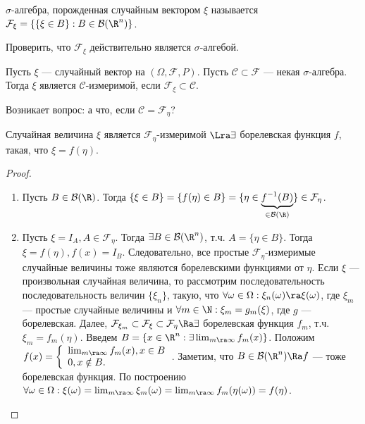 \begin{definition}
    \(\sigma\)-алгебра, порожденная случайным вектором \(\xi\) называется \(\mathcal{F}_\xi = \{\{\xi \in B\}: B \in \mathcal{B}(\R^n)\}\).
\end{definition}

\begin{exercise}
    Проверить, что \(\mathcal{F}_\xi\) действительно является \(\sigma\)-алгебой.
\end{exercise}

\begin{definition}
    Пусть \(\xi\) --- случайный вектор на \((\Omega, \mathcal{F}, P)\). Пусть \(\mathcal{C} \subset \mathcal{F}\) --- некая \(\sigma\)-алгебра. Тогда \(\xi\) является \(\mathcal{C}\)-измеримой, если \(\mathcal{F}_\xi \subset \mathcal{C}\).
\end{definition}

Возникает вопрос: а что, если \(\mathcal{C} = \mathcal{F}_\eta\)?
\begin{lemma}
    Случайная величина \(\xi\) является \(\mathcal{F}_\eta\)-измеримой \(\Lra \exists\) борелевская функция \(f\), такая, что \(\xi = f(\eta)\).
\end{lemma}
\begin{proof}\indent
    \begin{enumerate}
        \item [\(\La\)] Пусть \(B \in \mathcal{B}(\R)\). Тогда \(\{\xi \in B\} = \{f(\eta) \in B\} = \{\eta \in \underbrace{f^{-1}(B)}_{\in \mathcal{B}(\R)}\} \in \mathcal{F}_\eta\).
        \item [\(\Ra\)] Пусть \(\xi = I_A, A \in \mathcal{F}_\eta\). Тогда \(\exists B \in \mathcal{B}(\R^n)\), т.ч. \(A = \{\eta \in B\}\). Тогда \(\xi = f(\eta), f(x) = I_B\). Следовательно, все простые \(\mathcal{F}_\eta\)-измеримые случайные величины тоже являются борелевскими функциями от \(\eta\). Если \(\xi\) --- произвольная случайная величина, то рассмотрим последовательность последовательность величин \(\{\xi_n\}\), такую, что \(\forall \omega \in \Omega: \xi_n(\omega) \ra \xi(\omega)\), где \(\xi_m\) --- простые случайные величины и \(\forall m \in \N: \xi_m = g_m(\xi)\), где \(g\) --- борелевская. Далее, \(\mathcal{F}_{\xi_m} \subset \mathcal{F}_{\xi} \subset \mathcal{F}_{\eta} \Ra \exists \) борелевская функция \(f_m\), т.ч. \(\xi_m = f_m(\eta)\). Введем \(B = \{x \in \R^n: \exists \lim_{m \ra \infty} f_m(x)\}\). Положим \(f(x) = \left\{\begin{array}{l}
            \lim_{m \ra \infty} f_m(x), x \in B \\
            0, x \notin B.
        \end{array}\right.\). Заметим, что \(B \in \mathcal{B}(\R^n) \Ra f\) --- тоже борелевская функция. По построению \(\forall \omega \in \Omega: \xi(\omega) = \lim_{m \ra \infty}\xi_m(\omega) = \lim_{m \ra \infty}f_m(\eta(\omega)) = f(\eta)\).
    \end{enumerate}
\end{proof}

